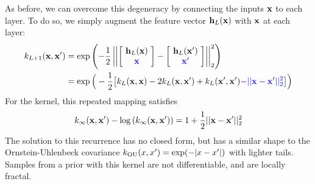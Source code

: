 As before, we can overcome this degeneracy by %
connecting the inputs ${\bf{x}}$ to each layer.  To do so, we simply augment the feature vector ${\bf{h}}_{L}({\bf{x}})$ with ${\bf{x}}$ at each layer: 
%
\begin{align}
 k_{L+1}(\vx, \vx') %
& = \exp \left( -\frac{1}{2} \left|\left| \left[ \! \begin{array}{c} \hPhi_{L}(\vx) \\ {\color{blue} \vx} \end{array} \! \right]  - \left[ \! \begin{array}{c} \hPhi_{L}(\vx') \\ {\color{blue} \vx'} \end{array} \! \right] \right| \right|_2^2 \right) \nonumber \\
& = \exp \Big( -\frac{1}{2} \big[ k_{L}(\vx, \vx) - 2 k_{L}(\vx, \vx') %
 + k_{L}(\vx', \vx') {\color{blue} - || \vx - \vx' ||_2^2} \big] \Big)
\end{align}
%
For the  kernel, this repeated mapping satisfies
\begin{align}
k_\infty({\bf{x}}, {\bf{x}}') - \log \left( k_\infty({\bf{x}}, {\bf{x}}') \right) = 1 + \frac{1}{2} || {\bf{x}} - {\bf{x}}' ||_2^2
\end{align}
%
The solution to this recurrence has no closed form, but has a similar shape to the Ornstein-Uhlenbeck covariance ${k_{\textnormal{OU}}(x,x') = \exp( -|x - x'| )}$ with lighter tails.
%
Samples from a \gp{} prior with this kernel are not differentiable, and are locally fractal.

